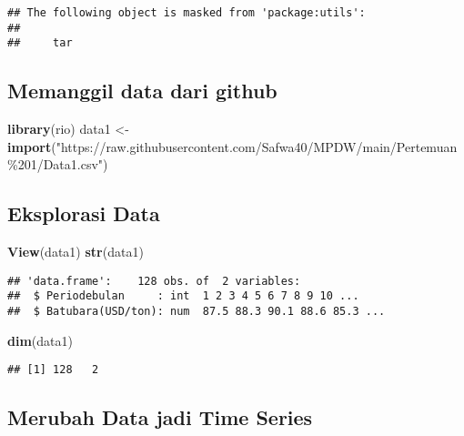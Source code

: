 \documentclass[
]{article}
\newenvironment{Shaded}{\begin{snugshade}}{\end{snugshade}}
\newcommand{\FunctionTok}[1]{\textcolor[rgb]{0.13,0.29,0.53}{\textbf{#1}}}
\newcommand{\NormalTok}[1]{#1}
\newcommand{\OtherTok}[1]{\textcolor[rgb]{0.56,0.35,0.01}{#1}}
\newcommand{\StringTok}[1]{\textcolor[rgb]{0.31,0.60,0.02}{#1}}
\begin{document}
\begin{verbatim}
## The following object is masked from 'package:utils':
## 
##     tar
\end{verbatim}

\hypertarget{memanggil-data-dari-github}{%
\subsection{Memanggil data dari
github}\label{memanggil-data-dari-github}}

\begin{Shaded}
\begin{Highlighting}[]
\FunctionTok{library}\NormalTok{(rio)}
\NormalTok{data1 }\OtherTok{\textless{}{-}} \FunctionTok{import}\NormalTok{(}\StringTok{"https://raw.githubusercontent.com/Safwa40/MPDW/main/Pertemuan\%201/Data1.csv"}\NormalTok{)}
\end{Highlighting}
\end{Shaded}

\hypertarget{eksplorasi-data}{%
\subsection{Eksplorasi Data}\label{eksplorasi-data}}

\begin{Shaded}
\begin{Highlighting}[]
\FunctionTok{View}\NormalTok{(data1)}
\FunctionTok{str}\NormalTok{(data1)}
\end{Highlighting}
\end{Shaded}

\begin{verbatim}
## 'data.frame':    128 obs. of  2 variables:
##  $ Periodebulan     : int  1 2 3 4 5 6 7 8 9 10 ...
##  $ Batubara(USD/ton): num  87.5 88.3 90.1 88.6 85.3 ...
\end{verbatim}

\begin{Shaded}
\begin{Highlighting}[]
\FunctionTok{dim}\NormalTok{(data1)}
\end{Highlighting}
\end{Shaded}

\begin{verbatim}
## [1] 128   2
\end{verbatim}

\hypertarget{merubah-data-jadi-time-series}{%
\subsection{Merubah Data jadi Time
Series}\label{merubah-data-jadi-time-series}}
\end{document}

